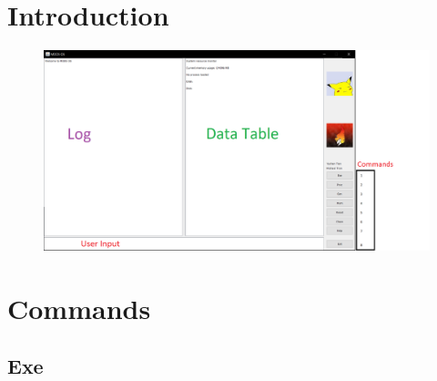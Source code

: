 \documentclass[10pt]{article}
\title{
\vspace{2in}
\textmd{\textbf{\projecttitle} \\}
\vspace{5in}
}
\author{\textbf{\hmwkAuthorName}}
\date{} %
\begin{document}
\maketitle








\newpage

\tableofcontents

\newpage













\section{Introduction}

\begin{figure}[H]
	\centering
	\includegraphics[width=\linewidth]{Untitled}
\end{figure}


\section{Commands}

\subsection{Exe}
\end{document}
